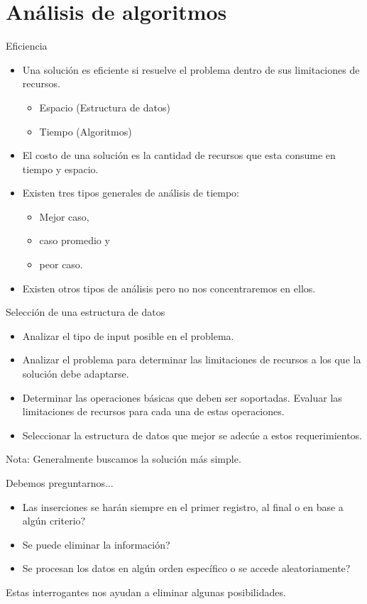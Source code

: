 \documentclass[aspectratio=169]{beamer}
\begin{document}
\section{Análisis de algoritmos}

\begin{frame}{Eficiencia}
  \begin{itemize}
    \item Una solución es eficiente si resuelve el problema dentro de sus limitaciones de recursos.
    \begin{itemize}
      \item Espacio (Estructura de datos)
      \item Tiempo (Algoritmos)
    \end{itemize}
    \item El costo de una solución es la cantidad de recursos que esta consume en tiempo y espacio.
    \item Existen tres tipos generales de análisis de tiempo:
    \begin{itemize}
      \item Mejor caso,
      \item caso promedio y
      \item peor caso.
    \end{itemize}
    \item Existen otros tipos de análisis pero no nos concentraremos en ellos.
  \end{itemize}
\end{frame}

\begin{frame}{Selección de una estructura de datos}
  \begin{itemize}
    \item Analizar el tipo de input posible en el problema.
    \item Analizar el problema para determinar las limitaciones de recursos a los que la solución debe adaptarse.
    \item Determinar las operaciones básicas que deben ser soportadas. Evaluar las limitaciones de recursos para cada una de estas operaciones.
    \item Seleccionar la estructura de datos que mejor se adecúe a estos requerimientos.
  \end{itemize}
  Nota: Generalmente buscamos la solución más simple.
\end{frame}

\begin{frame}{Debemos preguntarnos...}
  \begin{itemize}
    \item Las inserciones se harán siempre en el primer registro, al final o en base a algún criterio?
    \item Se puede eliminar la información?
    \item Se procesan los datos en algún orden específico o se accede aleatoriamente?
  \end{itemize}
  Estas interrogantes nos ayudan a eliminar algunas posibilidades.
\end{frame}
\end{document}
